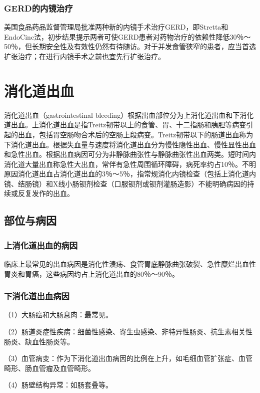 \subsubsection{GERD的内镜治疗}

美国食品药品监督管理局批准两种新的内镜手术治疗GERD，即Stretta和EndoCinc法，初步结果提示两者可使GERD患者对药物治疗的依赖性降低30％～50％，但长期安全性及有效性仍然有待随访。对于并发食管狭窄的患者，应当首选扩张治疗；在进行内镜手术之前也宜先行扩张治疗。

\section{消化道出血}

消化道出血（gastrointestinal
bleeding）根据出血部位分为上消化道出血和下消化道出血。上消化道出血是指Treitz韧带以上的食管、胃、十二指肠和胰胆等病变引起的出血，包括胃空肠吻合术后的空肠上段病变。Treitz韧带以下的肠道出血称为下消化道出血。根据失血量与速度将消化道出血分为慢性隐性出血、慢性显性出血和急性出血。根据出血病因可分为非静脉曲张性与静脉曲张性出血两类。短时间内消化道大量出血称急性大出血，常伴有急性周围循环障碍，病死率约占10％。不明原因消化道出血占消化道出血的3％～5％，指常规消化内镜检查（包括上消化道内镜、结肠镜）和X线小肠钡剂检查（口服钡剂或钡剂灌肠造影）不能明确病因的持续或反复发作的出血。

\subsection{部位与病因}

\subsubsection{上消化道出血的病因}

临床上最常见的出血病因是消化性溃疡、食管胃底静脉曲张破裂、急性糜烂出血性胃炎和胃癌，这些病因约占上消化道出血的80％～90％。

\subsubsection{下消化道出血病因}

（1）大肠癌和大肠息肉：最常见。

（2）肠道炎症性疾病：细菌性感染、寄生虫感染、非特异性肠炎、抗生素相关性肠炎、缺血性肠炎等。

（3）血管病变：作为下消化道出血病因的比例在上升，如毛细血管扩张症、血管畸形、肠血管瘤及血管畸形。

（4）肠壁结构异常：如肠套叠等。

